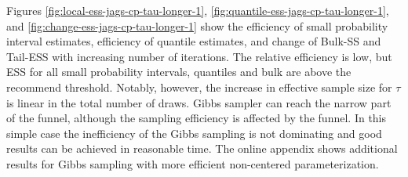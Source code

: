 \documentclass[american,]{article}
\theoremstyle{definition}
\begin{document}
Figures \ref{fig:local-ess-jags-cp-tau-longer-1},
\ref{fig:quantile-ess-jags-cp-tau-longer-1}, and
\ref{fig:change-ess-jags-cp-tau-longer-1} show the efficiency of small
probability interval estimates, efficiency of quantile estimates, and
change of Bulk-SS and Tail-ESS with increasing number of
iterations. The relative efficiency is low, but ESS for all small
probability intervals, quantiles and bulk are above the recommend
threshold. Notably, however, the increase in effective sample size for
$\tau$ is linear in the total number of draws.  Gibbs sampler can
reach the narrow part of the funnel, although the sampling efficiency
is affected by the funnel. In this simple case the inefficiency of the
Gibbs sampling is not dominating and good results can be achieved in
reasonable time. The online appendix shows additional results for Gibbs
sampling with more efficient non-centered parameterization.
\end{document}
